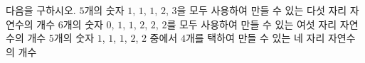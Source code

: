 다음을 구하시오.
 $5$개의 숫자 $1$, $1$, $1$, $2$, $3$을 모두 사용하여 만들 수 있는 다섯 자리 자연수의 개수
 $6$개의 숫자 $0$, $1$, $1$, $2$, $2$, $2$를 모두 사용하여 만들 수 있는 여섯 자리 자연수의 개수
 $5$개의 숫자 $1$, $1$, $1$, $2$, $2$ 중에서 $4$개를 택하여 만들 수 있는 네 자리 자연수의 개수
